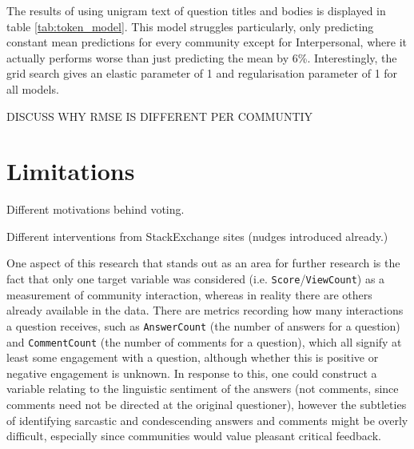 \documentclass[11pt,preprint, authoryear]{article}
\numberwithin{equation}{section}
\begin{document}
\normalsize

The results of using unigram text of question titles and bodies is
displayed in table \ref{tab:token_model}. This model struggles
particularly, only predicting constant mean predictions for every
community except for Interpersonal, where it actually performs worse
than just predicting the mean by 6\%. Interestingly, the grid search
gives an elastic parameter of 1 and regularisation parameter of 1 for
all models.

DISCUSS WHY RMSE IS DIFFERENT PER COMMUNTIY

\section{\texorpdfstring{Limitations
\label{Limit}}{Limitations }}\label{limitations}

Different motivations behind voting.

Different interventions from StackExchange sites (nudges introduced
already.)

One aspect of this research that stands out as an area for further
research is the fact that only one target variable was considered (i.e.
\texttt{Score}/\texttt{ViewCount}) as a measurement of community
interaction, whereas in reality there are others already available in
the data. There are metrics recording how many interactions a question
receives, such as \texttt{AnswerCount} (the number of answers for a
question) and \texttt{CommentCount} (the number of comments for a
question), which all signify at least some engagement with a question,
although whether this is positive or negative engagement is unknown. In
response to this, one could construct a variable relating to the
linguistic sentiment of the answers (not comments, since comments need
not be directed at the original questioner), however the subtleties of
identifying sarcastic and condescending answers and comments might be
overly difficult, especially since communities would value pleasant
critical feedback.
\end{document}
